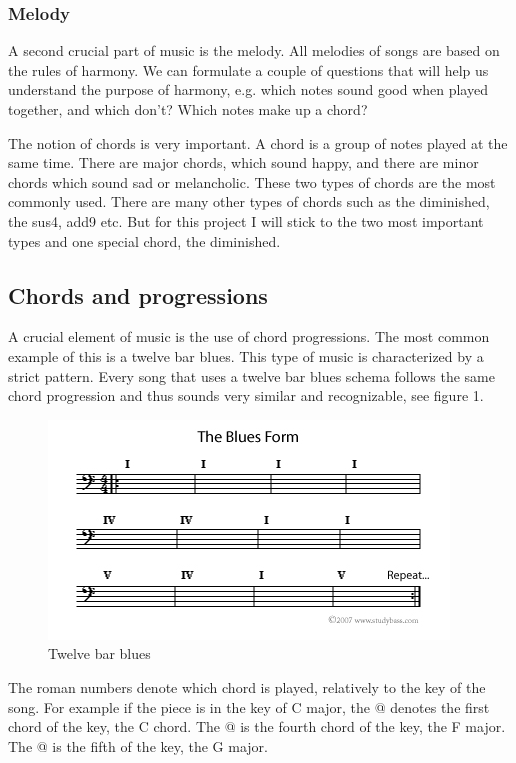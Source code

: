 \documentclass[12pt]{article}
\makeatletter
\newcommand*{\rom}[1]{\expandafter\@slowromancap\romannumeral #1@}
\makeatother
\begin{document}
\subsubsection{Melody}

A second crucial part of music is the melody. All melodies of songs are based on the rules of harmony. We can formulate a couple of questions that will help us understand the purpose of harmony, e.g. which notes sound good when played together, and which don't? Which notes make up a chord?
\newline

The notion of chords is very important. A chord is a group of notes played at the same time.
There are major chords, which sound happy, and there are minor chords which sound sad or melancholic. These two types of chords are the most commonly used. There are many other types of chords such as the diminished, the sus4, add9 etc. But for this project I will stick to the two most important types and one special chord, the diminished.

\subsection{Chords and progressions}

A crucial element of music is the use of chord progressions. The most common example of this is a twelve bar blues. This type of music is characterized by a strict pattern. Every song that uses a twelve bar blues schema follows the same chord progression and thus sounds very similar and recognizable, see figure 1.

\begin{figure}[h]
\centering
\includegraphics[scale=0.8]{img/the-blues-form}
\caption{Twelve bar blues}
\end{figure}

The roman numbers denote which chord is played, relatively to the key of the song. For example if the piece is in the key of C major, the \rom{1} denotes the first chord of the key, the C chord. The \rom{4} is the fourth chord of the key, the F major. The \rom{5} is the fifth of the key, the G major.
\newline
\end{document}
